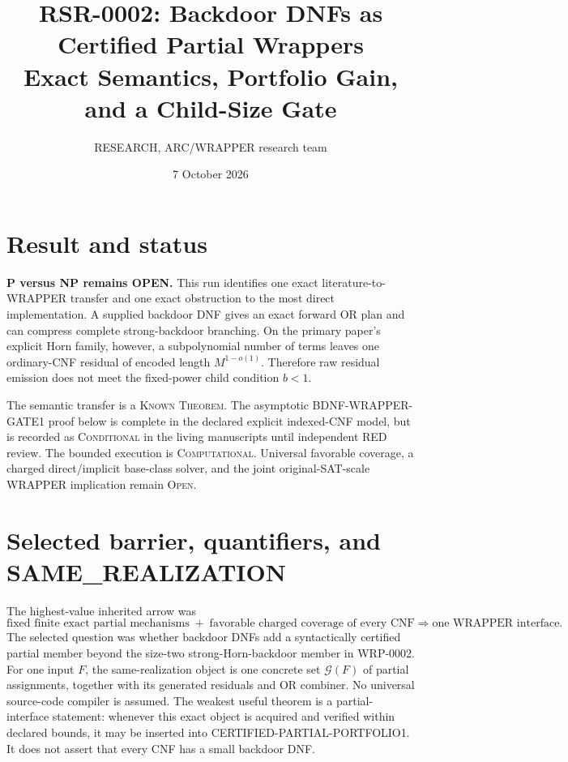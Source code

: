 \documentclass[11pt]{article}
\title{RSR-0002: Backdoor DNFs as Certified Partial Wrappers\\
Exact Semantics, Portfolio Gain, and a Child-Size Gate}
\author{RESEARCH, ARC/WRAPPER research team}
\date{7 October 2026}
\begin{document}
\maketitle

\section*{Result and status}
\textbf{P versus NP remains OPEN.}  This run identifies one exact
literature-to-WRAPPER transfer and one exact obstruction to the most direct
implementation.  A supplied backdoor DNF gives an exact forward OR plan and
can compress complete strong-backdoor branching.  On the primary paper's
explicit Horn family, however, a subpolynomial number of terms leaves one
ordinary-CNF residual of encoded length $M^{1-o(1)}$.  Therefore raw residual
emission does not meet the fixed-power child condition $b<1$.

The semantic transfer is a \textsc{Known Theorem}.  The asymptotic
BDNF-WRAPPER-GATE1 proof below is complete in the declared explicit indexed-CNF
model, but is recorded as \textsc{Conditional} in the living manuscripts until
independent RED review.  The bounded execution is \textsc{Computational}.
Universal favorable coverage, a charged direct/implicit base-class solver,
and the joint original-SAT-scale WRAPPER implication remain \textsc{Open}.

\section*{Selected barrier, quantifiers, and SAME\_REALIZATION}
The highest-value inherited arrow was
\[
 \text{fixed finite exact partial mechanisms}
 \; + \; \text{favorable charged coverage of every CNF}
 \Longrightarrow \text{one WRAPPER interface}.
\]
The selected question was whether backdoor DNFs add a syntactically certified
partial member beyond the size-two strong-Horn-backdoor member in WRP-0002.
For one input $F$, the same-realization object is one concrete set
$\mathcal G(F)$ of partial assignments, together with its generated residuals
and OR combiner.  No universal source-code compiler is assumed.  The weakest
useful theorem is a partial-interface statement: whenever this exact object is
acquired and verified within declared bounds, it may be inserted into
CERTIFIED-PARTIAL-PORTFOLIO1.  It does not assert that every CNF has a small
backdoor DNF.
\end{document}

